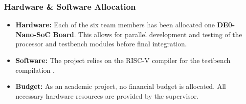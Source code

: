 \documentclass[10pt]{article}
\begin{document}
\subsubsection*{Hardware \& Software Allocation}
\begin{itemize}
    \item \textbf{Hardware:} Each of the six team members has been allocated one \textbf{DE0-Nano-SoC Board}. This allows for parallel development and testing of the processor and testbench modules before final integration.
    \item \textbf{Software:} The project relies on the RISC-V compiler for the testbench compilation .
    \item \textbf{Budget:} As an academic project, no financial budget is allocated. All necessary hardware resources are provided by the supervisor.
\end{itemize}
\end{document}
